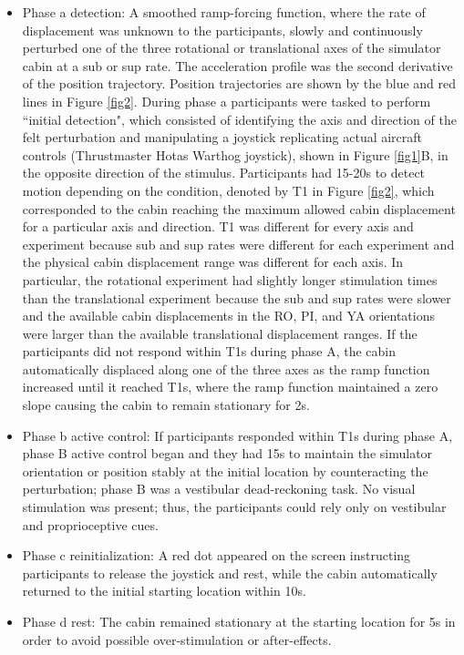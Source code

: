 \begin{itemize}
\item Phase a detection: A smoothed ramp-forcing function, where the rate of displacement was unknown to the participants, slowly and continuously perturbed one of the three rotational or translational axes of the simulator cabin at a sub or sup rate. The acceleration profile was the second derivative of the position trajectory. Position trajectories are shown by the blue and red lines in Figure \ref{fig2}. During phase a participants were tasked to perform ``initial detection", which consisted of identifying the axis and direction of the felt perturbation and manipulating a joystick replicating actual aircraft controls (Thrustmaster Hotas Warthog joystick), shown in Figure \ref{fig1}B, in the opposite direction of the stimulus. Participants had 15-20s to detect motion depending on the condition, denoted by T1 in Figure \ref{fig2}, which corresponded to the cabin reaching the maximum allowed cabin displacement for a particular axis and direction. T1 was different for every axis and experiment because sub and sup rates were different for each experiment and the physical cabin displacement range was different for each axis. In particular, the rotational experiment had slightly longer stimulation times than the translational experiment because the sub and sup rates were slower and the available cabin displacements in the RO, PI, and YA orientations were larger than the available translational displacement ranges. If the participants did not respond within T1s during phase A, the cabin automatically displaced along one of the three axes as the ramp function increased until it reached T1s, where the ramp function maintained a zero slope causing the cabin to remain stationary for 2s.
\item Phase b active control: If participants responded within T1s during phase A, phase B active control began and they had 15s to maintain the simulator orientation or position stably at the initial location by counteracting the perturbation; phase B was a vestibular dead-reckoning task. No visual stimulation was present; thus, the participants could rely only on vestibular and proprioceptive cues.
\item Phase c reinitialization: A red dot appeared on the screen instructing participants to release the joystick and rest, while the cabin automatically returned to the initial starting location within 10s.
\item Phase d rest: The cabin remained stationary at the starting location for 5s in order to avoid possible over-stimulation or after-effects.
\end{itemize}

